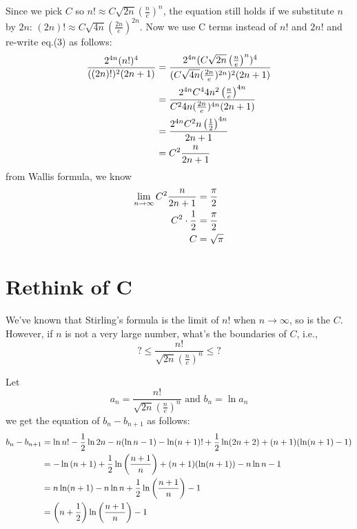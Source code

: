 \documentclass[11pt]{article}
\begin{document}
Since we pick $C$ so $\displaystyle n! \approx C  \sqrt{2n}  \left( \frac{n}{e} \right) ^n $,  the equation still holds if we substitute $n$ by $2n$:  $\displaystyle (2n)! \approx C  \sqrt{4n}  \left( \frac{2n}{e} \right) ^{2n} $.  Now we use C terms instead of $n!$ and $2n!$ and re-write eq.(3) as follows:
$$
\begin{aligned}[t]
\frac{2^{4n} (n!)^4} {((2n)!)^2 (2n+1)}
	&= \frac{2^{4n} (C  \sqrt{2n}  \left( \frac{n}{e} \right) ^n ) ^4 } { (C \sqrt{4n} ( \frac{2n}{e} ) ^{2n} ) ^2 (2n+1)} \\
	&= \frac{2^{4n} C^4  4n^2  \left( \frac{n}{e} \right) ^{4n} } { C^2 4n ( \frac{2n}{e} ) ^{4n} (2n+1)} \\
	&= \frac{2^{4n} C^2  n  \left( \frac{1}{2} \right) ^{4n} } { 2n+1} \\
	&= C^2 \frac{n} {2n+1} \\
\end{aligned}\\
$$
from Wallis formula,  we know
$$
\begin{aligned}[t]
\lim _{n \to \infty}  C^2 \frac{n} {2n+1} 
	&= \frac{\pi}{2} \\
C^2 \cdot \frac{1}{2} 
	&= \frac{\pi}{2} \\
C 	&= \sqrt{\pi} \\
\end{aligned} \\
$$


\section{\large Rethink of C}

We've known that Stirling's formula is the limit of $n!$ when $n \to \infty$,  so is the $C$.  However,  if $n$ is not a very large number, what's the boundaries of $C$, i.e., 
$$
? \leqslant   \frac {n!}  { \sqrt{2n}  \left( \frac{n}{e} \right) ^n } \leqslant ?
$$

Let 
$$
a_n =  \frac {n!}  { \sqrt{2n}  \left( \frac{n}{e} \right) ^n } 
\text{ \ \ \ \ and \ \ \ \ }
b_n = \ln a_n
$$
we get the equation of $b_n - b_{n+1}$ as follows:
$$
\begin{aligned}[t]
b_n - b_{n+1}
	&= \ln n! - \frac{1}{2} \ln {2n} - n(\ln n - 1) - \ln (n+1)! + \frac{1}{2} \ln (2n+2) + (n+1)( \ln (n+1) - 1) \\
	&= -\ln \left(n+1 \right) + \frac{1}{2} \ln \left(\frac{n+1}{n} \right) + (n+1)(\ln (n+1)) - n \ln n - 1 \\
	&=  n \ln (n+1) - n \ln n + \frac{1}{2} \ln \left( \frac{n+1}{n} \right) - 1 \\
	&= \left(n + \frac{1}{2} \right) \ln \left( \frac{n+1}{n} \right) -1 \\
\end{aligned} \\
$$
\end{document}
